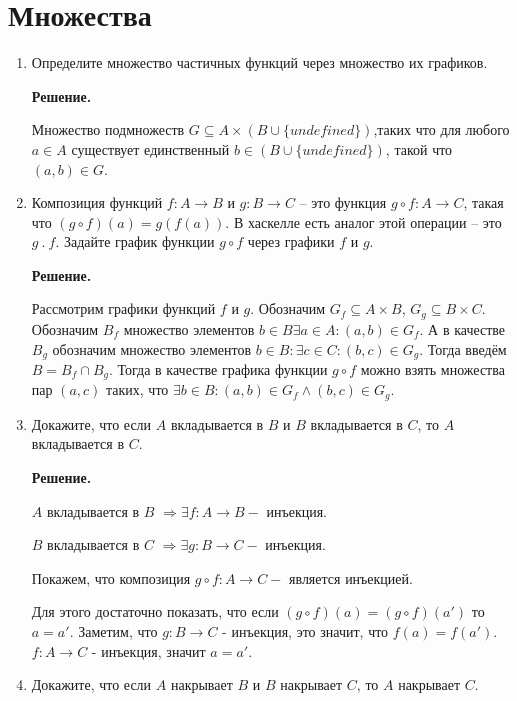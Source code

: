 \section*{Множества}
\begin{enumerate}

\item Определите множество частичных функций через множество их графиков.

\textbf{Решение.} 

Множество подмножеств $G \subseteq A \times (B \cup \{undefined\})$,таких что для любого $a \in A$ существует 
единственный $b \in (B \cup \{undefined\})$, такой что $(a, b) \in G$.

\item Композиция функций $f : A \to B$ и $g : B \to C$ -- это функция $g \circ f : A \to C$, такая что $(g 
\circ f)(a) = g(f(a))$.
    В хаскелле есть аналог этой операции -- это $g\ .\ f$. Задайте график функции $g \circ f$ через графики 
    $f$ и $g$.

\textbf{Решение.} 

Рассмотрим графики функций $f$ и $g$. Обозначим $G_f \subseteq A \times B$, $G_g \subseteq B \times C$. 
Обозначим $B_f$ множество элементов $b \in B \exists a \in A : (a, b) \in G_f$. А в качестве $B_g$ обозначим 
множество элементов $b\in B : \exists c \in C : (b, c) \in G_g$. Тогда введём $B = B_f \cap B_g$. Тогда в 
качестве графика функции $g \circ f$ можно взять множества пар $(a, c)$ таких, что $\exists b \in B : (a, b) 
\in G_f \land (b, c) \in G_g$.  

\item Докажите, что если $A$ вкладывается в $B$ и $B$ вкладывается в $C$, то $A$ вкладывается в $C$.

\textbf{Решение.} 

$A$ вкладывается в $B$ $\Rightarrow \exists f:A\rightarrow B - $ инъекция.

$B$ вкладывается в $C$ $\Rightarrow \exists g:B\rightarrow C - $ инъекция.

Покажем, что композиция $g \circ f : A\rightarrow C - $ является инъекцией.

Для этого достаточно показать, что если $(g \circ f)(a) = (g \circ f)(a')$ то $a = a'$. Заметим, что 
$g:B\rightarrow C$ - инъекция, это значит, что $f(a) = f(a')$. $f:A\rightarrow C$ - инъекция, значит $a = a'$.

\item Докажите, что если $A$ накрывает $B$ и $B$ накрывает $C$, то $A$ накрывает $C$.


\end{enumerate}

